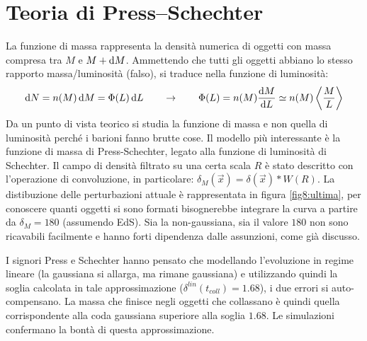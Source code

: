 \section{Teoria di Press–Schechter}
La funzione di massa rappresenta la densità numerica di oggetti con massa compresa tra $M$ e $M+\operatorname{d}\!{M}$. Ammettendo che tutti gli oggetti abbiano lo stesso rapporto massa/luminosità (falso), si traduce nella funzione di luminosità: 
\begin{equation}
    \operatorname{d}\!{N}=n(M)\operatorname{d}\!{M} = \Phi(L)\operatorname{d}\!{L} \qquad \rightarrow \qquad \Phi(L)=n(M)\frac{\operatorname{d}\!{M}}{\operatorname{d}\!{L}}\simeq n(M)\left\langle \frac{M}{L} \right\rangle 
\end{equation}
Da un punto di vista teorico si studia la funzione di massa e non quella di luminosità perché i barioni fanno brutte cose. Il modello più interessante è la funzione di massa di Press-Schechter, legato alla funzione di luminosità di Schechter. Il campo di densità filtrato su una certa scala $R$ è stato descritto con l'operazione di convoluzione, in particolare: $\delta_M (\vec{x})=\delta(\vec{x}) * W(R)$. La distibuzione delle perturbazioni attuale è rappresentata in figura \ref{fig8:ultima}, per conoscere quanti oggetti si sono formati bisognerebbe integrare la curva a partire da $\delta_M = 180$ (assumendo EdS). Sia la non-gaussiana, sia il valore $180$ non sono ricavabili facilmente e hanno forti dipendenza dalle assunzioni, come già discusso. 

I signori Press e Schechter hanno pensato che modellando l'evoluzione in regime lineare (la gaussiana si allarga, ma rimane gaussiana) e utilizzando quindi la soglia calcolata in tale approssimazione ($\delta^{lin}(t_{coll})=1.68$), i due errori si auto-compensano. La massa che finisce negli oggetti che collassano è quindi quella corrispondente alla coda gaussiana superiore alla soglia $1.68$. Le simulazioni confermano la bontà di questa approssimazione.

